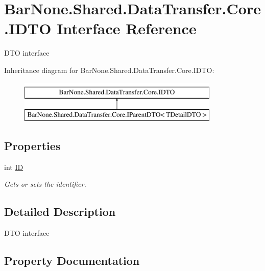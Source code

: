 \hypertarget{interface_bar_none_1_1_shared_1_1_data_transfer_1_1_core_1_1_i_d_t_o}{}\section{Bar\+None.\+Shared.\+Data\+Transfer.\+Core.\+I\+D\+TO Interface Reference}
\label{interface_bar_none_1_1_shared_1_1_data_transfer_1_1_core_1_1_i_d_t_o}


D\+TO interface  


Inheritance diagram for Bar\+None.\+Shared.\+Data\+Transfer.\+Core.\+I\+D\+TO\+:\begin{figure}[H]
\begin{center}
\leavevmode
\includegraphics[height=2.000000cm]{interface_bar_none_1_1_shared_1_1_data_transfer_1_1_core_1_1_i_d_t_o}
\end{center}
\end{figure}
\subsection*{Properties}
\begin{DoxyCompactItemize}
\item 
int \mbox{\hyperlink{interface_bar_none_1_1_shared_1_1_data_transfer_1_1_core_1_1_i_d_t_o_acac8847f9be115cc2c88f5d4e207544a}{ID}}
\begin{DoxyCompactList}\small\item\em Gets or sets the identifier. \end{DoxyCompactList}\end{DoxyCompactItemize}


\subsection{Detailed Description}
D\+TO interface 



\subsection{Property Documentation}
\mbox{\label{interface_bar_none_1_1_shared_1_1_data_transfer_1_1_core_1_1_i_d_t_o_acac8847f9be115cc2c88f5d4e207544a}} 
